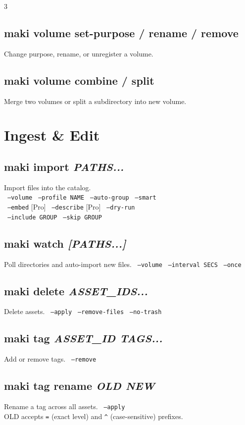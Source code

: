 \documentclass[a4paper,landscape,8pt]{article}
\newcommand{\cmd}[1]{\texttt{\footnotesize #1}}
\newcommand{\opt}[1]{\texttt{\scriptsize\color{maki-stone} #1}}
\newcommand{\pro}{\textcolor{maki-teal}{\scriptsize [Pro]}}
\begin{document}
\begin{multicols}{3}
\subsection{maki volume set-purpose / rename / remove}
Change purpose, rename, or unregister a volume.

\subsection{maki volume combine / split}
Merge two volumes or split a subdirectory into new volume.

\section{Ingest \& Edit}

\subsection{maki import \textit{PATHS...}}
Import files into the catalog. \\
\opt{--volume} \opt{--profile NAME} \opt{--auto-group} \opt{--smart} \\
\opt{--embed} \pro{} \opt{--describe} \pro{} \opt{--dry-run} \\
\opt{--include GROUP} \opt{--skip GROUP}

\subsection{maki watch \textit{[PATHS...]}}
Poll directories and auto-import new files. \opt{--volume} \opt{--interval SECS} \opt{--once}

\subsection{maki delete \textit{ASSET\_IDS...}}
Delete assets. \opt{--apply} \opt{--remove-files} \opt{--no-trash}

\subsection{maki tag \textit{ASSET\_ID TAGS...}}
Add or remove tags. \opt{--remove}

\subsection{maki tag rename \textit{OLD NEW}}
Rename a tag across all assets. \opt{--apply} \\
OLD accepts \cmd{=} (exact level) and \cmd{\textasciicircum} (case-sensitive) prefixes.


\end{multicols}
\end{document}
